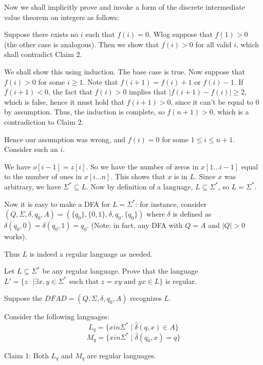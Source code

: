 \documentclass[answers]{exam}
\newcommand{\hd}{\hat{\delta}}
\begin{document}
\begin{questions}
\begin{solution}
        Now we shall implicitly prove and invoke a form of the discrete intermediate value theorem on integers as follows:

        Suppose there exists no $i$ such that $f(i) = 0$. Wlog suppose that $f(1) > 0$ (the other case is analogous). Then we show that $f(i) > 0$ for all valid $i$, which shall contradict Claim 2.

        We shall show this using induction. The base case is true. Now suppose that $f(i) > 0$ for some $i \ge 1$. Note that $f(i + 1) = f(i) + 1$ or $f(i) - 1$. If $f(i + 1) < 0$, the fact that $f(i)
        > 0$ implies that $|f(i + 1) - f(i)| \ge 2$, which is false, hence it must hold that $f(i + 1) > 0$, since it can't be equal to $0$ by assumption. Thus, the induction is complete, so $f(n + 1)
        > 0$, which is a contradiction to Claim 2.

        Hence our assumption was wrong, and $f(i) = 0$ for some $1 \le i \le n + 1$. Consider such an $i$.

        We have $o[i - 1] = z[i]$. So we have the number of zeros in $x[1 \ldots i - 1]$ equal to the number of ones in $x[i \ldots n]$. This shows that $x$ is in $L$. Since $x$ was arbitrary, we have
        $\Sigma^* \subseteq L$. Now by definition of a language, $L \subseteq \Sigma^*$, so $L = \Sigma^*$.

        Now it is easy to make a DFA for $L = \Sigma^*$: for instance, consider $(Q, \Sigma, \delta, q_0, A) = (\{q_0\}, \{0, 1\}, \delta, q_0, \{q_0\})$ where $\delta$ is defined as $\delta(q_0, 0)
        = \delta(q_0, 1) = q_0$. (Note: in fact, any DFA with $Q = A$ and $|Q| > 0$ works).

        Thus $L$ is indeed a regular language as needed.
    \end{solution}

    \question[6]
    Let $L\subseteq\Sigma^*$ be any regular language. Prove that the language $L'=\{z\text{ }|\exists x,y\in\Sigma^*\text{ such that }z=xy\text{ and }yx\in L\}$ is regular.

    \begin{solution}
        Suppose the $DFA D = (Q, \Sigma, \delta, q_0, A)$ recognizes $L$.

        Consider the following languages:
        \[
            L_q = \{x in \Sigma^* \mid \hd(q, x) \in A\}
        \]
        \[
            M_q = \{x in \Sigma^* \mid \hd(q_0, x) = q\}
        \]

        Claim 1: Both $L_q$ and $M_q$ are regular languages.


\end{solution}
\end{questions}
\end{document}
